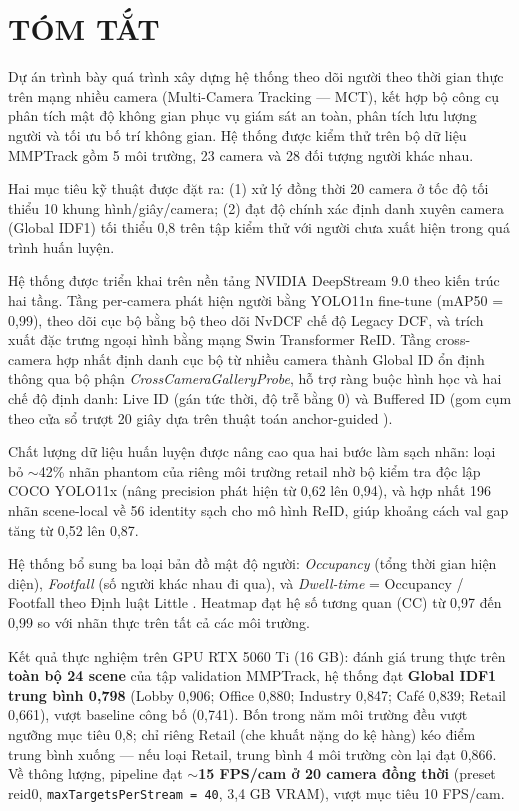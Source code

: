 \section*{TÓM TẮT}

Dự án trình bày quá trình xây dựng hệ thống theo dõi người theo thời gian thực trên mạng nhiều camera (Multi-Camera Tracking --- MCT), kết hợp bộ công cụ phân tích mật độ không gian phục vụ giám sát an toàn, phân tích lưu lượng người và tối ưu bố trí không gian. Hệ thống được kiểm thử trên bộ dữ liệu MMPTrack \cite{Han2022} gồm 5 môi trường, 23 camera và 28 đối tượng người khác nhau.

Hai mục tiêu kỹ thuật được đặt ra: (1) xử lý đồng thời 20 camera ở tốc độ tối thiểu 10 khung hình/giây/camera; (2) đạt độ chính xác định danh xuyên camera (Global IDF1) tối thiểu 0,8 trên tập kiểm thử với người chưa xuất hiện trong quá trình huấn luyện.

Hệ thống được triển khai trên nền tảng NVIDIA DeepStream 9.0 theo kiến trúc hai tầng. Tầng per-camera phát hiện người bằng YOLO11n fine-tune (mAP50 = 0,99), theo dõi cục bộ bằng bộ theo dõi NvDCF chế độ Legacy DCF, và trích xuất đặc trưng ngoại hình bằng mạng Swin Transformer ReID. Tầng cross-camera hợp nhất định danh cục bộ từ nhiều camera thành Global ID ổn định thông qua bộ phận \textit{CrossCameraGalleryProbe}, hỗ trợ ràng buộc hình học và hai chế độ định danh: Live ID (gán tức thời, độ trễ bằng 0) và Buffered ID (gom cụm theo cửa sổ trượt 20 giây dựa trên thuật toán anchor-guided \cite{Huang2023}).

Chất lượng dữ liệu huấn luyện được nâng cao qua hai bước làm sạch nhãn: loại bỏ $\sim$42\% nhãn phantom của riêng môi trường retail nhờ bộ kiểm tra độc lập COCO YOLO11x (nâng precision phát hiện từ 0,62 lên 0,94), và hợp nhất 196 nhãn scene-local về 56 identity sạch cho mô hình ReID, giúp khoảng cách val gap tăng từ 0,52 lên 0,87.

Hệ thống bổ sung ba loại bản đồ mật độ người: \textit{Occupancy} (tổng thời gian hiện diện), \textit{Footfall} (số người khác nhau đi qua), và \textit{Dwell-time} = Occupancy / Footfall theo Định luật Little \cite{Little1961}. Heatmap đạt hệ số tương quan (CC) từ 0,97 đến 0,99 so với nhãn thực trên tất cả các môi trường.

Kết quả thực nghiệm trên GPU RTX 5060 Ti (16 GB): đánh giá trung thực trên \textbf{toàn bộ 24 scene} của tập validation MMPTrack, hệ thống đạt \textbf{Global IDF1 trung bình 0,798} (Lobby 0,906; Office 0,880; Industry 0,847; Café 0,839; Retail 0,661), vượt baseline công bố (0,741). Bốn trong năm môi trường đều vượt ngưỡng mục tiêu 0,8; chỉ riêng Retail (che khuất nặng do kệ hàng) kéo điểm trung bình xuống --- nếu loại Retail, trung bình 4 môi trường còn lại đạt 0,866. Về thông lượng, pipeline đạt \textbf{$\sim$15 FPS/cam ở 20 camera đồng thời} (preset reid0, \texttt{maxTargetsPerStream = 40}, 3,4 GB VRAM), vượt mục tiêu 10 FPS/cam.

\cleardoublepage
